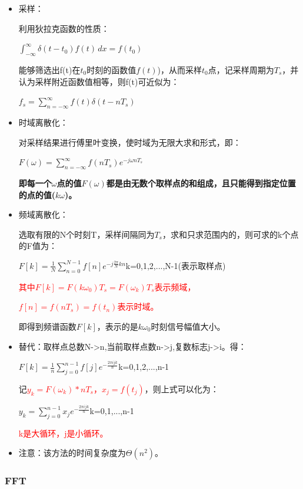 \documentclass[UTF8]{article}%
\begin{document}
\begin{itemize}
    \item 采样：
    
    利用狄拉克函数的性质：

    $\int_{-\infty}^{\infty} \delta (t-t_0)f(t) \,dx=f(t_0)$

    能够筛选出f(t)在$t_0$时刻的函数值$f(t)$)，从而采样$t_0$点，记采样周期为$T_s$，并认为采样附近函数值相等，则f(t)可近似为：

    $f_s=\sum_{n=-\infty}^{\infty}f(t)\delta (t-nT_s) $

    \item 时域离散化：
    
    对采样结果进行傅里叶变换，使时域为无限大求和形式，即：

    $F(\omega )=\sum_{n=-\infty}^{\infty}f(nT_s)e^{-j\omega nT_s}$
    
    \textbf{即每一个$\omega $点的值$F(\omega)$都是由无数个取样点的和组成，且只能得到指定位置的点的值($k\omega$)。}

    \item 频域离散化：
    
    选取有限的N个时刻T，采样间隔同为$T_s$，求和只求范围内的，则可求的k个点的F值为：
    
    $F[k]=\frac{1}{N} \sum_{n=0}^{N-1} f[n] e^{-j \frac{2 \pi}{N} k n}$\qquad k=0,1,2,...,N-1(表示取样点)

    \textcolor{red}{其中$F[k]=F(k\omega_0)T_s=F(\omega_k)T_s$表示频域，}
    
    \textcolor{red}{$f[n]=f(nT_s)=f(t_n)$表示时域。}

    即得到频谱函数$F[k]$，表示的是$k\omega_0$时刻信号幅值大小。

    \item 替代：取样点总数N->n,当前取样点数n->j,复数标志j->i。得：

    $F[k]=\frac{1}{n} \sum_{j=0}^{n-1} f[j] e^{- \frac{2 \pi i j k}{n}}$\qquad k=0,1,2,...,n-1
    
    记\textcolor{red}{$y_k=F(\omega_k)*nT_s$，$x_j=f(t_j)$}，则上式可以化为：

    $y_k=\sum_{j=0}^{n-1} x_j e^{- \frac{2 \pi i j k }{n}}$\qquad k=0,1,...,n-1

    \textcolor{red}{k是大循环，j是小循环。}

    \item 注意：该方法的时间复杂度为$\varTheta(n^2)$。
\end{itemize}

\subsubsection{FFT}
\end{document}
